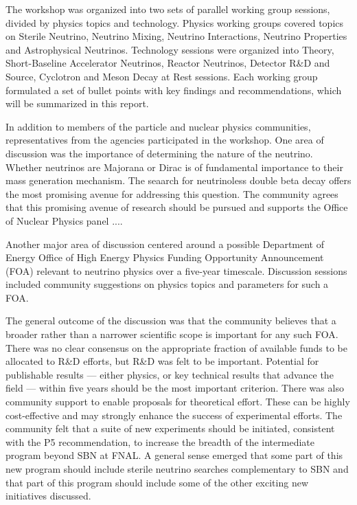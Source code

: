 The workshop was organized into two sets of parallel working group
sessions, divided by physics topics and technology.  Physics working
groups covered topics on Sterile Neutrino, Neutrino Mixing, Neutrino
Interactions, Neutrino Properties and Astrophysical Neutrinos.
Technology sessions were organized into Theory, Short-Baseline
Accelerator Neutrinos, Reactor Neutrinos, Detector R\&D and Source,
Cyclotron and Meson Decay at Rest sessions.  Each working group
formulated a set of bullet points with key findings and
recommendations, which will be summarized in this report.



In addition to members of the particle and nuclear physics
communities, representatives from the agencies participated in the workshop.
One area of discussion was the importance of determining the nature of the neutrino.
Whether neutrinos are Majorana or Dirac is of fundamental importance to their mass
generation mechanism. The seaarch for neutrinoless double beta decay offers the most
promising avenue for addressing this question. The community agrees that this 
promising avenue of research should be pursued and supports the Office of 
Nuclear Physics panel ....

Another major area of discussion centered around a possible Department of Energy
Office of High Energy Physics Funding Opportunity
Announcement (FOA) relevant to neutrino physics over a five-year timescale.
Discussion sessions included community suggestions on physics topics and 
parameters for such a FOA.

The general outcome of the discussion was that the community believes that a
broader rather than a narrower scientific scope is important for any such FOA.  There was no clear
consensus on the appropriate fraction of available funds to be
allocated to R\&D efforts, but R\&D was felt to be important.  
Potential for publishable results ---
either physics, or key technical results that advance the field ---
within five years should be the most important criterion.  There was
also community support to enable proposals for theoretical effort.
These can be highly cost-effective and may strongly enhance the
success of experimental efforts.  
The community felt that a suite of new experiments should be initiated, consistent
with the P5 recommendation, to increase the breadth of the intermediate program beyond SBN at FNAL. A general sense emerged that some part of this new program should
include sterile neutrino searches complementary to SBN and that part of this program
should include some of the other exciting new initiatives discussed.


